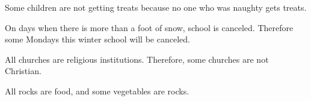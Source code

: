 \begin{exercises}

\item Some children are not getting treats because no one who was naughty gets treats.



\item On days when there is more than a foot of snow, school is canceled. Therefore some Mondays this winter school will be canceled. 




\item All churches are religious institutions. Therefore, some churches are not Christian.

\item All rocks are food, and some vegetables are rocks.




\end{exercises}
